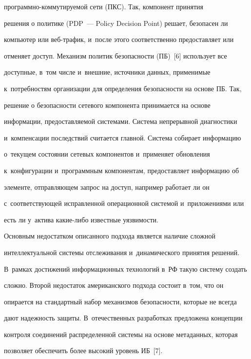 {про\-грам\-мно-ком\-му\-ти\-ру\-емой сети (ПКС). Так, компонент принятия 


решения о политике (PDP~--- Policy Decision Point) решает, безопасен ли 


компьютер или веб-тра\-фик, и~после этого соответственно предоставляет или 


отменяет доступ. Механизм политик безопас\-ности (ПБ)~[6] использует все 


доступные, в~том числе и~внешние, источники данных, применимые 


к~потребностям организации для определения безопасности на основе ПБ. Так, 


решение о безопасности сетевого компонента принимается на основе 


информации, предоставляемой системами. Система непрерывной диагностики 


и~компенсации последствий считается главной. Система собирает информацию 


о~текущем состоянии сетевых компонентов и~применяет обновления 


к~конфигурации и~программным компонентам, предоставляет информацию об 


элементе, отправляющем запрос на доступ, например работает ли он 


с~соответствующей исправленной операционной системой и~приложениями или 


есть ли у~актива ка\-кие-ли\-бо известные уязвимости.


  


   Основным недостатком описанного подхода является наличие сложной 


интеллектуальной системы отслеживания и~динамического принятия решений. 


В~рамках достижений информационных технологий в~РФ такую систему создать 


сложно. Второй недостаток американского подхода состоит в~том, что он 


опирается на стандартный набор механизмов безопасности, которые не всегда 


дают надежность защиты. В~отечественных разработках предложена концепции 


контроля соединений распределенной системы на основе метаданных, которая 


позволяет обеспечить более высокий уровень ИБ~[7].


  


}
